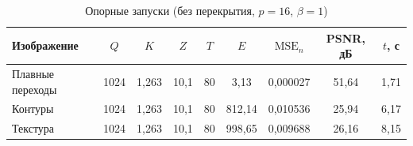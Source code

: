 \begin{table}[H]
\centering
\caption{Опорные запуски (без перекрытия, $p=16$, $\beta=1$)}
\label{tab:results}
\small
\begin{tabular}{@{}lcccccccc@{}}
\hline
Изображение & $Q$ & $K$ & $Z$ & $T$ & $E$ & $\mathrm{MSE}_n$ & PSNR, дБ & $t$, с \\
\hline
Плавные переходы & 1024 & 1{,}263 & 10{,}1 & 80 & 3{,}13 & 0{,}000027 & 51{,}64 & 1{,}71 \\
Контуры & 1024 & 1{,}263 & 10{,}1 & 80 & 812{,}14 & 0{,}010536 & 25{,}94 & 6{,}17 \\
Текстура & 1024 & 1{,}263 & 10{,}1 & 80 & 998{,}65 & 0{,}009688 & 26{,}16 & 8{,}15 \\
\hline
\end{tabular}
\end{table}
